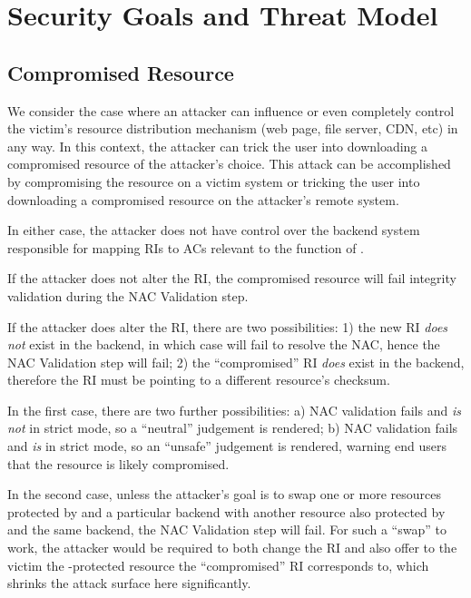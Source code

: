 \section{Security Goals and Threat Model} \label{sec:model}

\subsection{Compromised Resource}

We consider the case where an attacker can influence or even completely control
the victim's resource distribution mechanism (web page, file server, CDN, etc)
in any way. In this context, the attacker can trick the user into downloading a
compromised resource of the attacker's choice. This attack can be accomplished
by compromising the resource on a victim system or tricking the user into
downloading a compromised resource on the attacker's remote system.

In either case, the attacker does not have control over the backend system
responsible for mapping RIs to ACs relevant to the function of \SYSTEM{}.

If the attacker does not alter the RI, the compromised resource will fail
integrity validation during the NAC Validation step.

If the attacker does alter the RI, there are two possibilities: 1) the new RI
\textit{does not} exist in the backend, in which case \SYSTEM{} will fail to
resolve the NAC, hence the NAC Validation step will fail; 2) the ``compromised''
RI \textit{does} exist in the backend, therefore the RI must be pointing to a
different resource's checksum.

In the first case, there are two further possibilities: a) NAC validation fails
and \SYSTEM{} \emph{is not} in strict mode, so a ``neutral'' judgement is
rendered; b) NAC validation fails and \SYSTEM{} \emph{is} in strict mode, so an
``unsafe'' judgement is rendered, warning end users that the resource is likely
compromised.

In the second case, unless the attacker's goal is to swap one or more resources
protected by \SYSTEM{} and a particular backend with another resource also
protected by \SYSTEM{} and the same backend, the NAC Validation step will fail.
For such a ``swap'' to work, the attacker would be required to both change the
RI and also offer to the victim the \SYSTEM{}-protected resource the
``compromised'' RI corresponds to, which shrinks the attack surface here
significantly.


